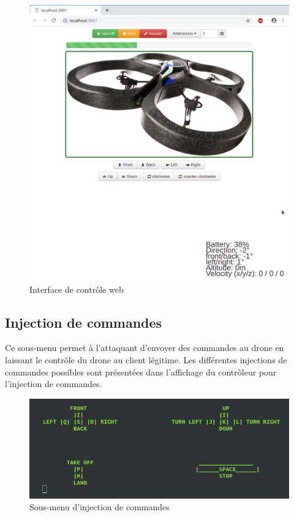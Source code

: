 \begin{figure}[H]
  \centering
  \includegraphics[scale=0.35]{images/control_application.png}
  \caption{Interface de contrôle web}
\end{figure}

\subsection{Injection de commandes}
Ce sous-menu permet à l'attaquant d'envoyer des commandes au drone en laissant le contrôle du drone au client légitime. Les différentes injections de commandes possibles sont présentées dans l'affichage du contrôleur pour l'injection de commandes.

\begin{figure}[H]
  \centering
  \includegraphics[scale=0.6]{images/injection_command_controler.png}
  \caption{Sous-menu d'injection de commandes}
\end{figure}

